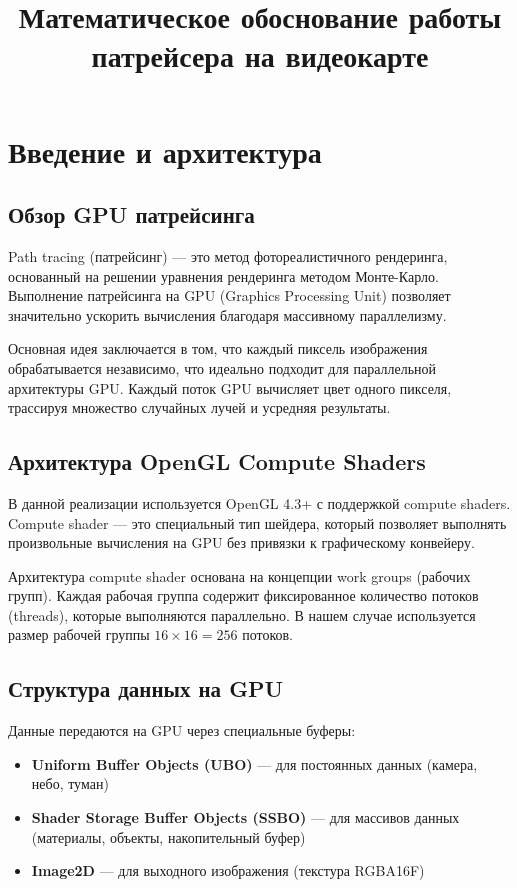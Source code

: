 \documentclass[14pt, a4paper]{extarticle}
\begin{document}
\title{Математическое обоснование работы патрейсера на видеокарте}
\author{}
\date{}
\maketitle

\section{Введение и архитектура}

\subsection{Обзор GPU патрейсинга}

Path tracing (патрейсинг) --- это метод фотореалистичного рендеринга, основанный на решении уравнения рендеринга методом Монте-Карло. Выполнение патрейсинга на GPU (Graphics Processing Unit) позволяет значительно ускорить вычисления благодаря массивному параллелизму.

Основная идея заключается в том, что каждый пиксель изображения обрабатывается независимо, что идеально подходит для параллельной архитектуры GPU. Каждый поток GPU вычисляет цвет одного пикселя, трассируя множество случайных лучей и усредняя результаты.

\subsection{Архитектура OpenGL Compute Shaders}

В данной реализации используется OpenGL 4.3+ с поддержкой compute shaders. Compute shader --- это специальный тип шейдера, который позволяет выполнять произвольные вычисления на GPU без привязки к графическому конвейеру.

Архитектура compute shader основана на концепции work groups (рабочих групп). Каждая рабочая группа содержит фиксированное количество потоков (threads), которые выполняются параллельно. В нашем случае используется размер рабочей группы $16 \times 16 = 256$ потоков.

\subsection{Структура данных на GPU}

Данные передаются на GPU через специальные буферы:
\begin{itemize}
    \item \textbf{Uniform Buffer Objects (UBO)} --- для постоянных данных (камера, небо, туман)
    \item \textbf{Shader Storage Buffer Objects (SSBO)} --- для массивов данных (материалы, объекты, накопительный буфер)
    \item \textbf{Image2D} --- для выходного изображения (текстура RGBA16F)
\end{itemize}
\end{document}
